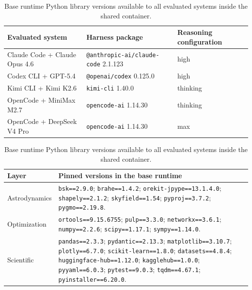 \documentclass[]{mosi}
\begin{document}
\begin{table}[!t]
\centering
\begingroup
\footnotesize
\setlength{\tabcolsep}{5pt}
\begin{tabular}{>{\raggedright\arraybackslash}p{}>{\raggedright\arraybackslash}p{}>{\raggedright\arraybackslash}p{}}
\hline
\textbf{Evaluated system} & \textbf{Harness package} & \textbf{Reasoning configuration} \\
\hline
Claude Code + Claude Opus 4.6 & \texttt{@anthropic-ai/claude-code} 2.1.123 & high \\
Codex CLI + GPT-5.4 & \texttt{@openai/codex} 0.125.0 & high \\
Kimi CLI + Kimi K2.6 & \texttt{kimi-cli} 1.40.0 & thinking \\
OpenCode + MiniMax M2.7 & \texttt{opencode-ai} 1.14.30 & thinking \\
OpenCode + DeepSeek V4 Pro & \texttt{opencode-ai} 1.14.30 & max \\
\hline
\end{tabular}
\caption{Harness package and reasoning configuration for the five evaluated systems. Versions are taken from the shared base runtime.}
\label{tab:agent-system-versions}
\endgroup

\vspace{0.75\baselineskip}

\begingroup
\small
\setlength{\tabcolsep}{4pt}
\begin{tabular}{>{\raggedright\arraybackslash}p{}>{\raggedright\arraybackslash}p{}}
\hline
\textbf{Layer} & \textbf{Pinned versions in the base runtime} \\
\hline
Astrodynamics & \texttt{bsk==2.9.0}; \texttt{brahe==1.4.2}; \texttt{orekit-jpype==13.1.4.0}; \texttt{shapely==2.1.2}; \texttt{skyfield==1.54}; \texttt{pyproj==3.7.2}; \texttt{pygmo==2.19.8}. \\
Optimization & \texttt{ortools==9.15.6755}; \texttt{pulp==3.3.0}; \texttt{networkx==3.6.1}; \texttt{numpy==2.2.6}; \texttt{scipy==1.17.1}; \texttt{sympy==1.14.0}. \\
Scientific & \texttt{pandas==2.3.3}; \texttt{pydantic==2.13.3}; \texttt{matplotlib==3.10.7}; \texttt{plotly==6.7.0}; \texttt{scikit-learn==1.8.0}; \texttt{datasets==4.8.4}; \texttt{huggingface-hub==1.12.0}; \texttt{kagglehub==1.0.0}; \texttt{pyyaml==6.0.3}; \texttt{pytest==9.0.3}; \texttt{tqdm==4.67.1}; \texttt{pyinstaller==6.20.0}. \\
\hline
\end{tabular}
\caption{Base runtime Python library versions available to all evaluated systems inside the shared container.}
\label{tab:runtime-library-versions}
\endgroup
\end{table}
\end{document}
